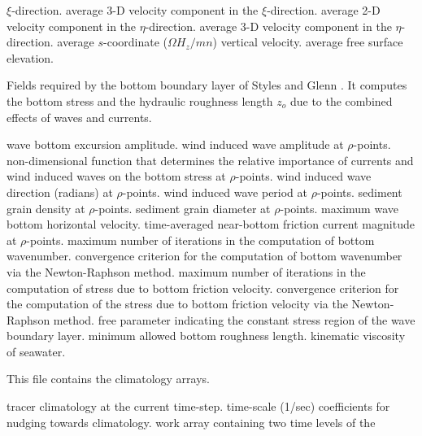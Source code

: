 \begin{klist}
\begin{klist}
  $\xi$-direction.
           average 3-D velocity component in the
  $\xi$-direction.
           average 2-D velocity component in the
  $\eta$-direction.
           average 3-D velocity component in the
  $\eta$-direction.
           average $s$-coordinate ($\Omega H_z/mn$)
vertical velocity.
          average free surface elevation.
    \end{klist}
    Fields required by the bottom boundary layer of
  Styles and Glenn \cite{Styles96}.  It computes the bottom stress and
  the hydraulic roughness length $z_o$ due to the combined effects of
  waves and currents.
    \begin{klist}
                wave bottom excursion amplitude.
             wind induced wave amplitude at $\rho$-points.
                non-dimensional function that determines the
    relative importance of currents and wind induced waves on the bottom
    stress at $\rho$-points.
             wind induced wave direction (radians) at
    $\rho$-points.
             wind induced wave period at $\rho$-points.
             sediment grain density at $\rho$-points.
             sediment grain diameter at $\rho$-points.
                maximum wave bottom horizontal velocity.
            time-averaged near-bottom friction current
    magnitude at $\rho$-points.
          maximum number of iterations in the
    computation of bottom wavenumber.
           convergence criterion for the computation of
   bottom wavenumber via the Newton-Raphson method.
          maximum number of iterations in the
   computation of stress due to bottom friction velocity.
           convergence criterion for the computation
   of the stress due to bottom friction velocity via the
   Newton-Raphson method.
          free parameter indicating the constant
   stress region of the wave boundary layer.
         minimum allowed bottom roughness length.
             kinematic viscosity of seawater.
    \end{klist}
    This file contains the climatology arrays.
    \begin{klist}
              tracer climatology at the current time-step.
           time-scale (1/sec) coefficients for nudging
    towards climatology.
            work array containing two time levels of the

\end{klist}
\end{klist}
